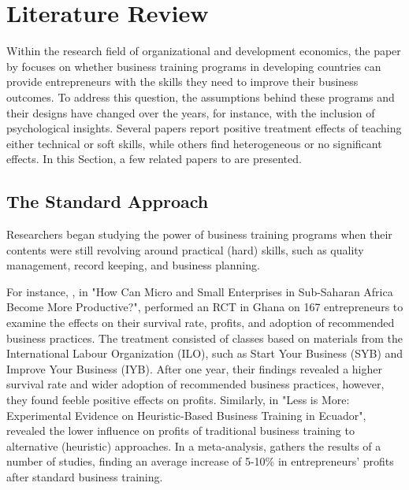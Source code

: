 \chapter{Literature Review}
\label{sec-literature-rev}

Within the research field of organizational and development economics, the paper by \cite{Ubfal2022} focuses on whether business training programs in developing countries can provide entrepreneurs with the skills they need to improve their business outcomes. To address this question, the assumptions behind these programs and their designs have changed over the years, for instance, with the inclusion of psychological insights. Several papers report positive treatment effects of teaching either technical or soft skills, while others find heterogeneous or no significant effects. In this Section, a few related papers to \cite{Ubfal2022} are presented.

\section{The Standard Approach}

Researchers began studying the power of business training programs when their contents were still revolving around practical (hard) skills, such as quality management, record keeping, and business planning.

For instance, \cite{Mano2012}, in "How Can Micro and Small Enterprises in Sub-Saharan Africa Become More Productive?", performed an RCT in Ghana on 167 entrepreneurs to examine the effects on their survival rate, profits, and adoption of recommended business practices. The treatment consisted of classes based on materials from the International Labour Organization (ILO), such as Start Your Business (SYB) and Improve Your Business (IYB). After one year, their findings revealed a higher survival rate and wider adoption of recommended business practices, however, they found feeble positive effects on profits. Similarly, in "Less is More: Experimental Evidence on Heuristic-Based Business Training in Ecuador", \cite{Arraiz2019} revealed the lower influence on profits of traditional business training to alternative (heuristic) approaches. In a meta-analysis, \cite{McKenzie2020} gathers the results of a number of studies, finding an average increase of 5-10\% in entrepreneurs' profits after standard business training.

